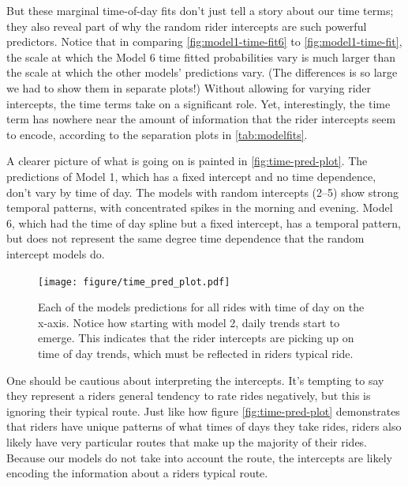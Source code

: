 \documentclass[]{article}
\begin{document}
But these marginal time-of-day fits don't just tell a story about our
time terms; they also reveal part of why the random rider intercepts are
such powerful predictors. Notice that in comparing
\autoref{fig:model1-time-fit6} to \autoref{fig:model1-time-fit}, the
scale at which the Model 6 time fitted probabilities vary is much larger
than the scale at which the other models' predictions vary. (The
differences is so large we had to show them in separate plots!) Without
allowing for varying rider intercepts, the time terms take on a
significant role. Yet, interestingly, the time term has nowhere near the
amount of information that the rider intercepts seem to encode,
according to the separation plots in \autoref{tab:modelfits}.

A clearer picture of what is going on is painted in
\autoref{fig:time-pred-plot}. The predictions of Model 1, which has a
fixed intercept and no time dependence, don't vary by time of day. The
models with random intercepts (2--5) show strong temporal patterns, with
concentrated spikes in the morning and evening. Model 6, which had the
time of day spline but a fixed intercept, has a temporal pattern, but
does not represent the same degree time dependence that the random
intercept models do.

\begin{figure}[tbh]
\centering
\texttt{[image: figure/time\_pred\_plot.pdf]}
\caption[Each of the models predictions for all rides with time of day on the x-axis.
Notice how starting with model 2, daily trends start to emerge. This indicates that the
rider intercepts are picking up on time of day trends, which must be reflected in riders
typical ride.]{\normalsize{Each of the models predictions for all rides with time of day on the x-axis.
Notice how starting with model 2, daily trends start to emerge. This indicates that the
rider intercepts are picking up on time of day trends, which must be reflected in riders
typical ride.}}
\label{fig:time-pred-plot}
\end{figure}

One should be cautious about interpreting the intercepts. It's tempting
to say they represent a riders general tendency to rate rides
negatively, but this is ignoring their typical route. Just like how
figure \autoref{fig:time-pred-plot} demonstrates that riders have unique
patterns of what times of days they take rides, riders also likely have
very particular routes that make up the majority of their rides. Because
our models do not take into account the route, the intercepts are likely
encoding the information about a riders typical route.
\end{document}
